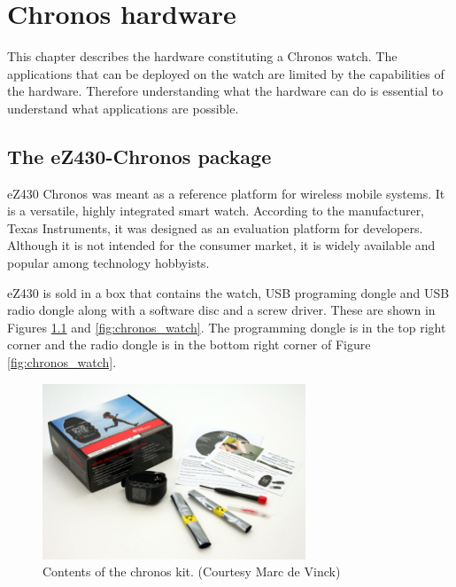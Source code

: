 \chapter{Chronos hardware}

This chapter describes the hardware constituting a Chronos watch. The
applications that can be deployed on the watch are limited by the
capabilities of the hardware. Therefore understanding what the
hardware can do is essential to understand what applications are
possible.

\section{The eZ430-Chronos package}

eZ430 Chronos was meant as a reference platform for wireless mobile
systems.  It is a versatile, highly integrated smart watch.  According
to the manufacturer, Texas Instruments, it was designed  as an
evaluation platform for developers.  Although it is not intended for
the consumer market, it is widely available and popular among
technology hobbyists.

eZ430 is sold in a box that contains the watch, USB programing dongle
and USB radio dongle along with a software disc and a screw driver.
These are shown in Figures \ref{fig:chronos_kit} and
\ref{fig:chronos_watch}.  The programming dongle is in the top right
corner and the radio dongle is in the bottom right corner of Figure
\ref{fig:chronos_watch}.

\begin{figure}[h]
  \centering
  \includegraphics[width=0.7\textwidth]{img/chronos_kit.jpg}
  \caption{Contents of the chronos kit. (Courtesy Marc de
  Vinck)}
  \label{fig:chronos_kit}
\end{figure}

